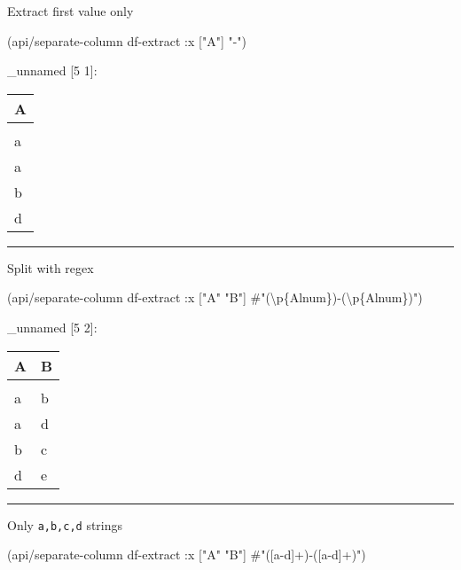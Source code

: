 \documentclass[]{article}
\newenvironment{Shaded}{\begin{snugshade}}{\end{snugshade}}
\newcommand{\StringTok}[1]{\textcolor[rgb]{0.31,0.60,0.02}{#1}}
\newcommand{\SpecialStringTok}[1]{\textcolor[rgb]{0.31,0.60,0.02}{#1}}
\newcommand{\AttributeTok}[1]{\textcolor[rgb]{0.77,0.63,0.00}{#1}}
\newcommand{\NormalTok}[1]{#1}
\begin{document}
Extract first value only

\begin{Shaded}
\begin{Highlighting}[]
\NormalTok{(api/separate-column df-extract }\AttributeTok{:x}\NormalTok{ [}\StringTok{"A"}\NormalTok{] }\StringTok{"-"}\NormalTok{)}
\end{Highlighting}
\end{Shaded}

\_unnamed {[}5 1{]}:

\begin{longtable}[]{@{}l@{}}
\toprule
A\tabularnewline
\midrule
\endhead
\tabularnewline
a\tabularnewline
a\tabularnewline
b\tabularnewline
d\tabularnewline
\bottomrule
\end{longtable}

\begin{center}\rule{0.5\linewidth}{0.5pt}\end{center}

Split with regex

\begin{Shaded}
\begin{Highlighting}[]
\NormalTok{(api/separate-column df-extract }\AttributeTok{:x}\NormalTok{ [}\StringTok{"A"} \StringTok{"B"}\NormalTok{] }\SpecialStringTok{#"(\textbackslash{}p\{Alnum\})-(\textbackslash{}p\{Alnum\})"}\NormalTok{)}
\end{Highlighting}
\end{Shaded}

\_unnamed {[}5 2{]}:

\begin{longtable}[]{@{}ll@{}}
\toprule
A & B\tabularnewline
\midrule
\endhead
&\tabularnewline
a & b\tabularnewline
a & d\tabularnewline
b & c\tabularnewline
d & e\tabularnewline
\bottomrule
\end{longtable}

\begin{center}\rule{0.5\linewidth}{0.5pt}\end{center}

Only \texttt{a,b,c,d} strings

\begin{Shaded}
\begin{Highlighting}[]
\NormalTok{(api/separate-column df-extract }\AttributeTok{:x}\NormalTok{ [}\StringTok{"A"} \StringTok{"B"}\NormalTok{] }\SpecialStringTok{#"([a-d]+)-([a-d]+)"}\NormalTok{)}
\end{Highlighting}
\end{Shaded}
\end{document}
